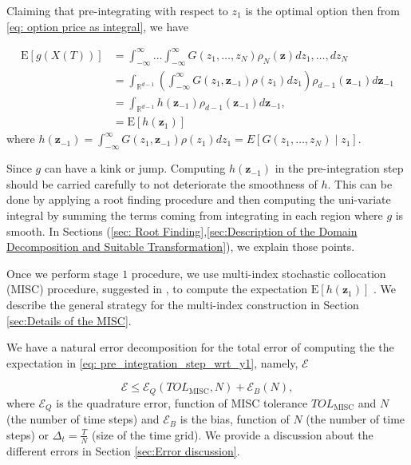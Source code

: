 \documentclass[11pt]{article}
\newcommand{\expt}[1]{\mathrm{E}\left[#1\right]}
\newcommand{\rset}{\mathbb{R}}
\newcommand{\COMMA}{,}
\begin{document}
Claiming that pre-integrating with respect to $z_1$ is the optimal option then from \eqref{eq: option price as integral}, we have

\begin{align}\label{eq: pre_integration_step_wrt_y1}
\expt{g(X(T))}&=\int_{-\infty}^{\infty} \dots \int_{-\infty}^{\infty} G(z_1,\dots,z_N) \rho_N(\mathbf{z}) dz_1,\dots,dz_N \nonumber\\ 
&=\int_{\rset^{d-1}} \left(\int_{-\infty}^\infty G(z_1,\mathbf{z}_{-1}) \rho(z_1) dz_1  \right) \rho_{d-1}(\mathbf{z}_{-1}) d\mathbf{z}_{-1}\nonumber\\	
&=\int_{\rset^{d-1}} h(\mathbf{z}_{-1}) \rho_{d-1}(\mathbf{z}_{-1}) d\mathbf{z}_{-1}\COMMA \\ \nonumber
	&=\expt{h(\mathbf{z}_1)}
\end{align}
where $h(\mathbf{z}_{-1})=\int_{-\infty}^\infty G(z_1,\mathbf{z}_{-1}) \rho(z_1) dz_1=  E\left[ G\left(z_1, \ldots, z_N \right)  \mid z_1\right] $.


Since $g$ can have a kink  or jump. Computing $h(\mathbf{z}_{-1})$ in the pre-integration step should be carried carefully to not deteriorate the smoothness of $h$. This can be done by applying a root finding procedure and then computing the uni-variate integral by summing the terms coming from integrating in each region where $g$ is smooth. In Sections (\ref{sec: Root Finding},\ref{sec:Description of the Domain Decomposition and Suitable Transformation}), we explain those points.



Once we perform stage $1$ procedure,  we use  multi-index stochastic collocation (MISC) procedure, suggested in \cite{haji2016multi}, to compute the expectation $\expt{h(\mathbf{z}_1)}$ . We describe the general strategy for the multi-index construction in Section \ref{sec:Details of the MISC}. 


We have a natural error decomposition for the total error of computing the the expectation in \eqref{eq: pre_integration_step_wrt_y1}, namely, $\mathcal{E}$

\begin{equation}\label{eq:total_error}
\mathcal{E} \le \mathcal{E}_Q(TOL_{\text{MISC}},N) + \mathcal{E}_B(N),
\end{equation}
where  $\mathcal{E}_Q$ is the quadrature error, function of MISC tolerance $TOL_{\text{MISC}}$ and $N$ (the number of time steps)  and  $\mathcal{E}_B$  is the bias, function of $N$ (the number of time steps) or $\Delta_t=\frac{T}{N}$ (size of the time grid). We provide a discussion about the different errors in Section \ref{sec:Error discussion}.
\end{document}
